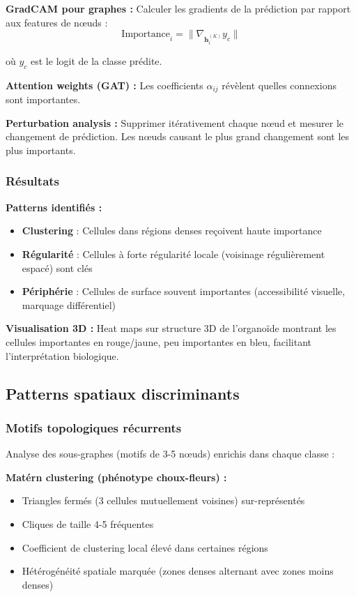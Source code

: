 \textbf{GradCAM pour graphes :}
Calculer les gradients de la prédiction par rapport aux features de nœuds :
\[
\text{Importance}_i = \|\nabla_{\mathbf{h}_i^{(K)}} y_c\|
\]

où $y_c$ est le logit de la classe prédite.

\textbf{Attention weights (GAT) :}
Les coefficients $\alpha_{ij}$ révèlent quelles connexions sont importantes.

\textbf{Perturbation analysis :}
Supprimer itérativement chaque nœud et mesurer le changement de prédiction. Les nœuds causant le plus grand changement sont les plus importants.

\subsubsection{Résultats}

\textbf{Patterns identifiés :}
\begin{itemize}
    \item \textbf{Clustering} : Cellules dans régions denses reçoivent haute importance
    \item \textbf{Régularité} : Cellules à forte régularité locale (voisinage régulièrement espacé) sont clés
    \item \textbf{Périphérie} : Cellules de surface souvent importantes (accessibilité visuelle, marquage différentiel)
\end{itemize}

\textbf{Visualisation 3D :}
Heat maps sur structure 3D de l'organoïde montrant les cellules importantes en rouge/jaune, peu importantes en bleu, facilitant l'interprétation biologique.

\subsection{Patterns spatiaux discriminants}

\subsubsection{Motifs topologiques récurrents}

Analyse des sous-graphes (motifs de 3-5 nœuds) enrichis dans chaque classe :

\textbf{Matérn clustering (phénotype choux-fleurs) :}
\begin{itemize}
    \item Triangles fermés (3 cellules mutuellement voisines) sur-représentés
    \item Cliques de taille 4-5 fréquentes
    \item Coefficient de clustering local élevé dans certaines régions
    \item Hétérogénéité spatiale marquée (zones denses alternant avec zones moins denses)
\end{itemize}

